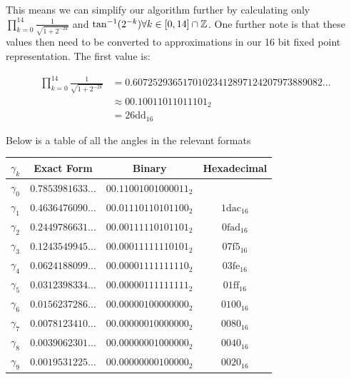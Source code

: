 {This means we can simplify our algorithm further by calculating only \(\prod_{k=0}^{14} \frac{1}{\sqrt{1 + 2^{-2k}}}\) and \(\tan^{-1}(2^{-k}) \forall k \in [0,14] \cap \mathbb{Z}\). One further note is that these values then need to be converted to approximations in our 16 bit fixed point representation. The first value is: 

\begin{align*}
	\prod_{k=0}^{14} \frac{1}{\sqrt{1 + 2^{-2k}}} &= 
		0.60725293651701023412897124207973889082\ldots\\
		&\approx \textrm{00.10011011011101}_2\\
		&= \textrm{26dd}_{16}
\end{align*}

Below is a table of all the angles in the relevant formats

\begin{center}
\begin{tabular}{|c|c|c|c|}
	\hline
	\(\gamma_k\) & Exact Form & Binary & Hexadecimal \\\hline
	\(\gamma_0\) & \(0.7853981633\ldots\)
		& \(\textrm{00.11001001000011}_2\)
		& \(\textrm{3243}_{16}\\\hline
	\(\gamma_1\) & \(0.4636476090\ldots\)
		& \(\textrm{00.01110110101100}_2\)
		& \(\textrm{1dac}_{16}\)\\\hline
	\(\gamma_2\) & \(0.2449786631\ldots\)
		& \(\textrm{00.00111110101101}_2\)
		& \(\textrm{0fad}_{16}\)\\\hline
	\(\gamma_3\) & \(0.1243549945\ldots\)
		& \(\textrm{00.00011111110101}_2\)
		& \(\textrm{07f5}_{16}\)\\\hline
	\(\gamma_4\) & \(0.0624188099\ldots\)
		& \(\textrm{00.00001111111110}_2\)
		& \(\textrm{03fe}_{16}\)\\\hline
	\(\gamma_5\) & \(0.0312398334\ldots\)
		& \(\textrm{00.00000111111111}_2\)
		& \(\textrm{01ff}_{16}\)\\\hline
	\(\gamma_6\) & \(0.0156237286\ldots\)
		& \(\textrm{00.00000100000000}_2\)
		& \(\textrm{0100}_{16}\)\\\hline
	\(\gamma_7\) & \(0.0078123410\ldots\)
		& \(\textrm{00.00000010000000}_2\)
		& \(\textrm{0080}_{16}\)\\\hline
	\(\gamma_8\) & \(0.0039062301\ldots\)
		& \(\textrm{00.00000001000000}_2\)
		& \(\textrm{0040}_{16}\)\\\hline
	\(\gamma_9\) & \(0.0019531225\ldots\)
		& \(\textrm{00.00000000100000}_2\)
		& \(\textrm{0020}_{16}\)\\\hline

\end{tabular}
\end{center}}
